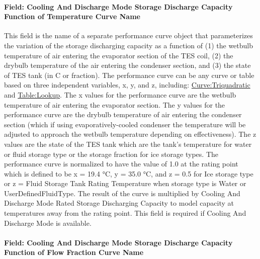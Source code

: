 \paragraph{Field: Cooling And Discharge Mode Storage Discharge Capacity Function of Temperature Curve Name}\label{field-cooling-and-discharge-mode-storage-discharge-capacity-function-of-temperature-curve-name}

This field is the name of a separate performance curve object that parameterizes the variation of the storage discharging capacity as a function of (1) the wetbulb temperature of air entering the evaporator section of the TES coil, (2) the drybulb temperature of the air entering the condenser section, and (3) the state of TES tank (in C or fraction). The performance curve can be any curve or table based on three independent variables, x, y, and z, including: \hyperref[curvetriquadratic]{Curve:Triquadratic} and \hyperref[tablelookup]{Table:Lookup}. The x values for the performance curve are the wetbulb temperature of air entering the evaporator section. The y values for the performance curve are the drybulb temperature of air entering the condenser section (which if using evaporatively-cooled condenser the temperature will be adjusted to approach the wetbulb temperature depending on effectiveness). The z values are the state of the TES tank which are the tank's temperature for water or fluid storage type or the storage fraction for ice storage types. The performance curve is normalized to have the value of 1.0 at the rating point which is defined to be x = 19.4 °C, y = 35.0 °C, and z = 0.5 for Ice storage type or z = Fluid Storage Tank Rating Temperature when storage type is Water or UserDefinedFluidType. The result of the curve is multiplied by Cooling And Discharge Mode Rated Storage Discharging Capacity to model capacity at temperatures away from the rating point. This field is required if Cooling And Discharge Mode is available.

\paragraph{Field: Cooling And Discharge Mode Storage Discharge Capacity Function of Flow Fraction Curve Name}\label{field-cooling-and-discharge-mode-storage-discharge-capacity-function-of-flow-fraction-curve-name}

